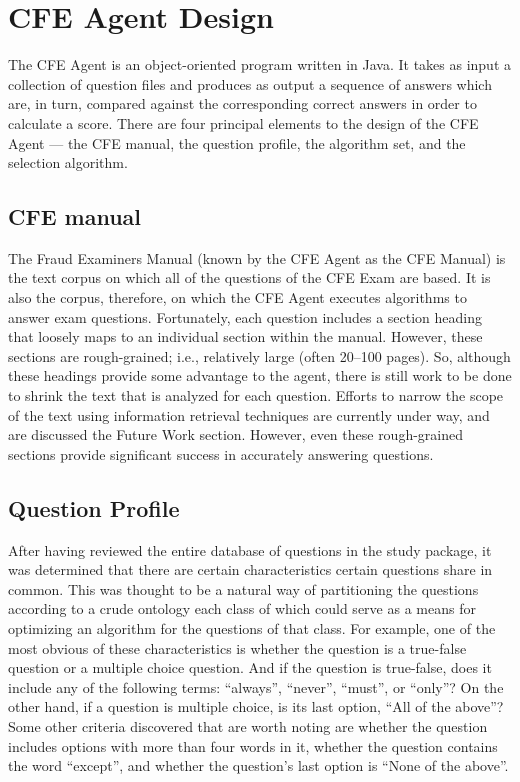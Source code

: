 \section{CFE Agent Design}
\label{sect:cfe_agent_design}

The CFE Agent is an object-oriented program written in Java.  It takes as input a collection of question files and produces as output a sequence of answers which are, in turn, compared against the corresponding correct answers in order to calculate a score.  There are four principal elements to the design of the CFE Agent --- the CFE manual, the question profile, the algorithm set, and the selection algorithm.

\subsection{CFE manual}

The Fraud Examiners Manual (known by the CFE Agent as the CFE Manual) is the text corpus on which all of the questions of the CFE Exam are based.  It is also the corpus, therefore, on which the CFE Agent executes algorithms to answer exam questions.  Fortunately, each question includes a section heading that loosely maps to an individual section within the manual.  However, these sections are rough-grained; i.e., relatively large (often 20--100 pages).  So, although these headings provide some advantage to the agent, there is still work to be done to shrink the text that is analyzed for each question.  Efforts to narrow the scope of the text using information retrieval techniques are currently under way, and are discussed the Future Work section.  However, even these rough-grained sections provide significant success in accurately answering questions. 

\subsection{Question Profile}

After having reviewed the entire database of questions in the study package, it was determined that there are certain characteristics certain questions share in common.  This was thought to be a natural way of partitioning the questions according to a crude ontology each class of which could serve as a means for optimizing an algorithm for the questions of that class.  For example, one of the most obvious of these characteristics is whether the question is a true-false question or a multiple choice question.  And if the question is true-false, does it include any of the following terms:  ``always'', ``never'', ``must'', or ``only''?  On the other hand, if a question is multiple choice, is its last option, ``All of the above''?  Some other criteria discovered that are worth noting are whether the question includes options with more than four words in it, whether the question contains the word ``except'', and whether the question's last option is ``None of the above''.

